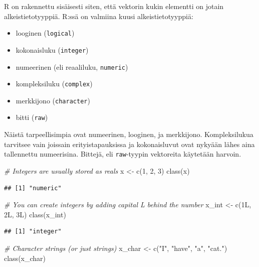\documentclass[
]{book}
\newenvironment{Shaded}{\begin{snugshade}}{\end{snugshade}}
\newcommand{\CommentTok}[1]{\textcolor[rgb]{0.56,0.35,0.01}{\textit{#1}}}
\newcommand{\DecValTok}[1]{\textcolor[rgb]{0.00,0.00,0.81}{#1}}
\newcommand{\FunctionTok}[1]{\textcolor[rgb]{0.00,0.00,0.00}{#1}}
\newcommand{\NormalTok}[1]{#1}
\newcommand{\OtherTok}[1]{\textcolor[rgb]{0.56,0.35,0.01}{#1}}
\newcommand{\StringTok}[1]{\textcolor[rgb]{0.31,0.60,0.02}{#1}}
\providecommand{\tightlist}{%
  \setlength{\itemsep}{0pt}\setlength{\parskip}{0pt}}
\begin{document}
R on rakennettu sisäisesti siten, että vektorin kukin elementti on jotain alkeistietotyyppiä. R:ssä on valmiina kuusi alkeistietotyyppiä:

\begin{itemize}
\tightlist
\item
  looginen (\texttt{logical})
\item
  kokonaisluku (\texttt{integer})
\item
  numeerinen (eli reaaliluku, \texttt{numeric})
\item
  kompleksiluku (\texttt{complex})
\item
  merkkijono (\texttt{character})
\item
  bitti (\texttt{raw})
\end{itemize}

Näistä tarpeellisimpia ovat numeerinen, looginen, ja merkkijono. Kompleksilukua tarvitsee vain joissain erityistapauksissa ja kokonaisluvut ovat nykyään lähes aina tallennettu numeerisina. Bittejä, eli \texttt{raw}-tyypin vektoreita käytetään harvoin.

\begin{Shaded}
\begin{Highlighting}[]
\CommentTok{\# Integers are usually stored as reals}
\NormalTok{x }\OtherTok{\textless{}{-}} \FunctionTok{c}\NormalTok{(}\DecValTok{1}\NormalTok{, }\DecValTok{2}\NormalTok{, }\DecValTok{3}\NormalTok{)}
\FunctionTok{class}\NormalTok{(x)}
\end{Highlighting}
\end{Shaded}

\begin{verbatim}
## [1] "numeric"
\end{verbatim}

\begin{Shaded}
\begin{Highlighting}[]
\CommentTok{\# You can create integers by adding capital L behind the number}
\NormalTok{x\_int }\OtherTok{\textless{}{-}} \FunctionTok{c}\NormalTok{(1L, 2L, 3L)}
\FunctionTok{class}\NormalTok{(x\_int)}
\end{Highlighting}
\end{Shaded}

\begin{verbatim}
## [1] "integer"
\end{verbatim}

\begin{Shaded}
\begin{Highlighting}[]
\CommentTok{\# Character strings (or just strings)}
\NormalTok{x\_char }\OtherTok{\textless{}{-}} \FunctionTok{c}\NormalTok{(}\StringTok{"I"}\NormalTok{, }\StringTok{"have"}\NormalTok{, }\StringTok{"a"}\NormalTok{, }\StringTok{"cat."}\NormalTok{)}
\FunctionTok{class}\NormalTok{(x\_char)}
\end{Highlighting}
\end{Shaded}
\end{document}

